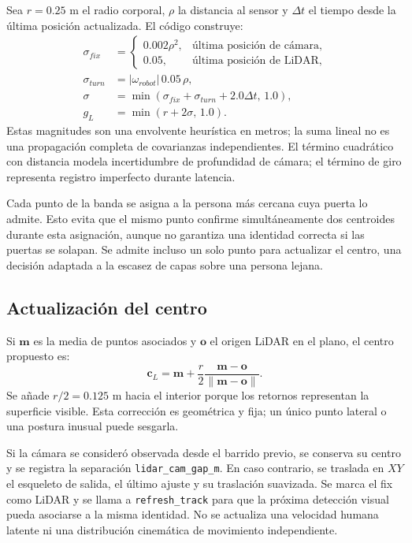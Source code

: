 \documentclass[11pt,a4paper]{article}
\newcommand{\code}[1]{\nolinkurl{#1}}
\begin{document}
Sea $r=0.25$ m el radio corporal, $\rho$ la distancia al sensor y $\Delta t$ el tiempo
desde la última posición actualizada. El código construye:
\begin{align}
 \sigma_{fix}&=\begin{cases}0.002\rho^2,&\text{última posición de cámara},\\0.05,&\text{última posición de LiDAR},\end{cases}\\
 \sigma_{turn}&=|\omega_{robot}|\,0.05\,\rho,\\
 \sigma&=\min(\sigma_{fix}+\sigma_{turn}+2.0\Delta t,\,1.0),\\
 g_L&=\min(r+2\sigma,\,1.0).
\end{align}
Estas magnitudes son una envolvente heurística en metros; la suma lineal no es una
propagación completa de covarianzas independientes. El término cuadrático con
distancia modela incertidumbre de profundidad de cámara; el término de giro
representa registro imperfecto durante latencia.~\cite{humanlidar,humanconfig}

Cada punto de la banda se asigna a la persona más cercana cuya puerta lo admite.
Esto evita que el mismo punto confirme simultáneamente dos centroides durante esta
asignación, aunque no garantiza una identidad correcta si las puertas se solapan.
Se admite incluso un solo punto para actualizar el centro, una decisión adaptada
a la escasez de capas sobre una persona lejana.~\cite{humanlidar}

\subsection{Actualización del centro}
Si $\bm{m}$ es la media de puntos asociados y $\bm{o}$ el origen LiDAR en el plano,
el centro propuesto es:
\begin{equation}
 \bm{c}_L=\bm{m}+\frac{r}{2}\frac{\bm{m}-\bm{o}}{\|\bm{m}-\bm{o}\|}.
\end{equation}
Se añade $r/2=0.125$ m hacia el interior porque los retornos representan la superficie
visible. Esta corrección es geométrica y fija; un único punto lateral o una postura
inusual puede sesgarla.~\cite{humanlidar}

Si la cámara se consideró observada desde el barrido previo, se conserva su centro
y se registra la separación \code{lidar_cam_gap_m}. En caso contrario, se traslada
en $XY$ el esqueleto de salida, el último ajuste y su traslación suavizada. Se marca
el fix como LiDAR y se llama a \code{refresh_track} para que la próxima detección
visual pueda asociarse a la misma identidad. No se actualiza una velocidad humana
latente ni una distribución cinemática de movimiento independiente.
\cite{humanlidar,humanworker,skeletonsource}
\end{document}
